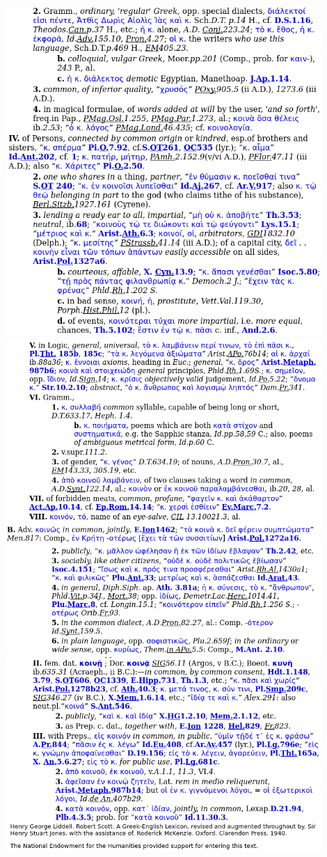 \documentclass[11pt]{article}
\begin{document}
\begin{thebibliography}{37}
\includegraphics[width=12cm]{koinos3}
\includegraphics[width=12cm]{koinos4}
\includegraphics[width=12cm]{koinos5}


\end{thebibliography}
\end{document}
